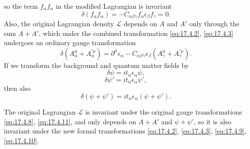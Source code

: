 so the term $f_\alpha f_\alpha$ in the modified Lagrangian is invariant
\begin{equation}
\delta(f_\alpha f_\alpha)
=-C_{\alpha\beta\gamma}f_\alpha\epsilon_\beta f_\gamma=0.
\label{eq:17.4.7}
\end{equation}
Also, the original Lagrangian density $\mathcal L$ depends on $A$ and $A'$
only through the sum $A+A'$, which under the combined transformation
\eqref{eq:17.4.2}, \eqref{eq:17.4.3} undergoes an ordinary gauge
transformation
\begin{equation}
\delta(A_\alpha^\mu+A_\alpha^{\prime\mu})
=\partial^\mu\epsilon_\alpha
-C_{\alpha\beta\gamma}\epsilon_\beta
(A_\gamma^\mu+A_\gamma^{\prime\mu}).
\label{eq:17.4.8}
\end{equation}
If we transform the background and quantum matter fields by
\begin{equation}
\delta\psi=it_\alpha\epsilon_\alpha\psi,
\label{eq:17.4.9}
\end{equation}
\begin{equation}
\delta\psi'=it_\alpha\epsilon_\alpha\psi',
\label{eq:17.4.10}
\end{equation}
then also
\begin{equation}
\delta(\psi+\psi')=it_\alpha\epsilon_\alpha(\psi+\psi').
\label{eq:17.4.11}
\end{equation}

The original Lagrangian $\mathcal L$ is invariant under the original gauge
transformations \eqref{eq:17.4.8}, \eqref{eq:17.4.11}, and only depends on
$A+A'$ and $\psi+\psi'$, so it is also invariant under the new formal
transformations \eqref{eq:17.4.2}, \eqref{eq:17.4.3},
\eqref{eq:17.4.9}, \eqref{eq:17.4.10}.

